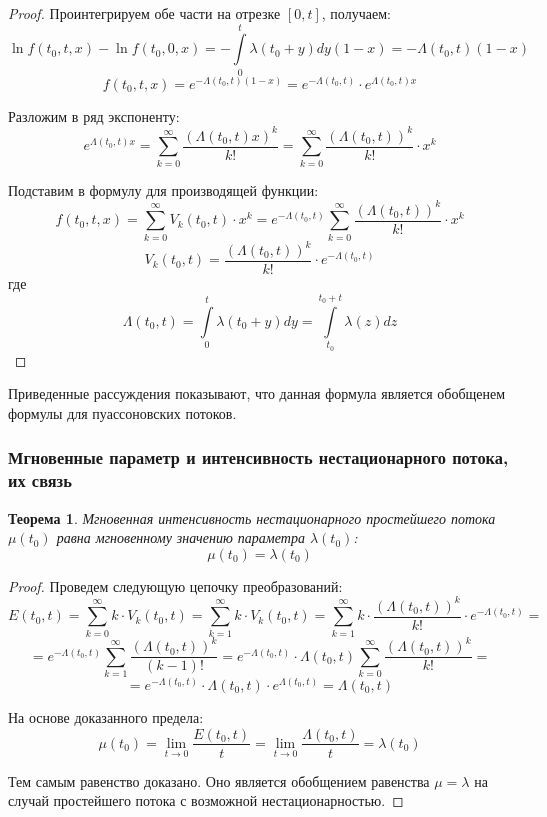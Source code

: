 \documentclass[aps,%
12pt,%
final,%
oneside,
onecolumn,%
musixtex, %
superscriptaddress,%
centertags]{article} %
\theoremstyle{plain}
\newtheorem{theorem}{Теорема}[section] %
\theoremstyle{definition}
\theoremstyle{remark}
\begin{document}
\begin{proof}
Проинтегрируем обе части на отрезке $[0,t]$, получаем:
$$\ln f(t_0,t,x) - \ln f(t_0,0,x) = - \int\limits_0^t \lambda(t_0 + y)dy (1-x) = - \Lambda(t_0,t)(1-x)$$
$$f(t_0,t,x) = e^{-\Lambda(t_0,t)(1-x)} = e^{-\Lambda(t_0,t)} \cdot e^{\Lambda(t_0,t)x}$$

Разложим в ряд экспоненту:
$$e^{\Lambda(t_0,t)x} = \sum\limits_{k=0}^{\infty}\frac{(\Lambda(t_0,t)x)^k}{k!} = \sum\limits_{k=0}^{\infty}\frac{(\Lambda(t_0,t))^k}{k!} \cdot x^k$$

Подставим в формулу для производящей функции:
$$f(t_0,t,x) = \sum\limits_{k=0}^{\infty} V_k(t_0,t) \cdot x^k = e^{-\Lambda(t_0,t)}\sum\limits_{k=0}^{\infty}\frac{(\Lambda(t_0,t))^k}{k!} \cdot x^k$$
$$V_k(t_0,t) = \frac{(\Lambda(t_0,t))^k}{k!} \cdot e^{-\Lambda(t_0,t)}$$
где 
$$\Lambda (t_0,t) = \int\limits_0^t \lambda(t_0+y)dy = \int\limits_{t_0}^{t_0+t}\lambda(z)dz$$
	
\end{proof}

Приведенные рассуждения показывают, что данная формула является обобщенем формулы для пуассоновских потоков.

\subsubsection{Мгновенные параметр и интенсивность нестационарного потока, их связь}

\begin{theorem}
	Мгновенная интенсивность нестационарного простейшего потока $\mu(t_0)$ равна мгновенному значению параметра $\lambda(t_0)$:
	$$\mu(t_0) = \lambda(t_0)$$
\end{theorem}
\begin{proof}
	Проведем следующую цепочку преобразований:
	$$E(t_0,t) = \sum\limits_{k=0}^{\infty} k \cdot V_k(t_0,t ) = \sum\limits_{k=1}^{\infty} k \cdot V_k(t_0,t) =  \sum\limits_{k=1}^{\infty} k \cdot \frac{(\Lambda(t_0,t))^k}{k!} \cdot e^{-\Lambda(t_0,t)} = $$
	$$ = e^{-\Lambda(t_0,t)} \sum\limits_{k=1}^{\infty} \frac{(\Lambda(t_0,t))^k}{(k-1)!} = e^{-\Lambda(t_0,t)} \cdot \Lambda(t_0,t) \sum\limits_{k=0}^{\infty} \frac{(\Lambda(t_0,t))^k}{k!} = $$
	$$ = e^{-\Lambda(t_0,t)} \cdot \Lambda(t_0,t) \cdot e^{\Lambda(t_0,t)} = \Lambda(t_0,t)$$

	На основе доказанного предела:
	$$\mu(t_0) = \lim\limits_{t \to 0} \frac{E(t_0,t)}{t} = \lim\limits_{t \to 0} \frac{\Lambda(t_0,t)}{t} = \lambda(t_0)$$

	Тем самым равенство доказано. Оно является обобщением равенства $\mu = \lambda$ на случай простейшего потока с возможной нестационарностью.
\end{proof}
\end{document}
